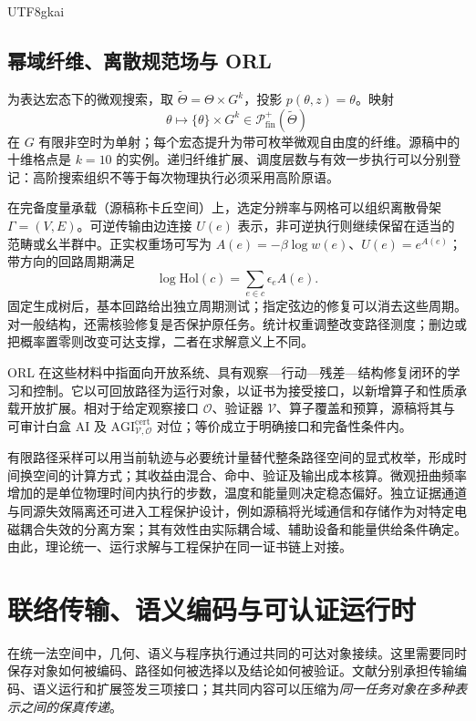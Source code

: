 \documentclass[11pt,a4paper]{article}
\theoremstyle{plain}
\theoremstyle{definition}
\theoremstyle{remark}
\begin{document}
\begin{CJK*}{UTF8}{gkai}
\subsection{幂域纤维、离散规范场与 ORL}

为表达宏态下的微观搜索，取 $\widetilde\Theta=\Theta\times G^k$，投影 $p(\theta,z)=\theta$。映射
\[
 \theta\longmapsto\{\theta\}\times G^k
 \in\mathcal P^+_{\mathrm{fin}}(\widetilde\Theta)
\]
在 $G$ 有限非空时为单射；每个宏态提升为带可枚举微观自由度的纤维。源稿中的十维格点是 $k=10$ 的实例。递归纤维扩展、调度层数与有效一步执行可以分别登记：高阶搜索组织不等于每次物理执行必须采用高阶原语。\cite{S16}

在完备度量承载（源稿称卡丘空间）上，选定分辨率与网格可以组织离散骨架 $\Gamma=(V,E)$。可逆传输由边连接 $U(e)$ 表示，非可逆执行则继续保留在适当的范畴或幺半群中。正实权重场可写为 $A(e)=-\beta\log w(e)$、$U(e)=e^{A(e)}$；带方向的回路周期满足
\[
 \log\mathrm{Hol}(c)=\sum_{e\in c}\epsilon_eA(e).
\]
固定生成树后，基本回路给出独立周期测试；指定弦边的修复可以消去这些周期。对一般结构，还需核验修复是否保护原任务。统计权重调整改变路径测度；删边或把概率置零则改变可达支撑，二者在求解意义上不同。

ORL 在这些材料中指面向开放系统、具有观察—行动—残差—结构修复闭环的学习和控制。它以可回放路径为运行对象，以证书为接受接口，以新增算子和性质承载开放扩展。相对于给定观察接口 $\mathcal O$、验证器 $\mathcal V$、算子覆盖和预算，源稿将其与可审计白盒 AI 及 $\mathrm{AGI}^{\mathrm{cert}}_{\mathcal V,\mathcal O}$ 对位；等价成立于明确接口和完备性条件内。

有限路径采样可以用当前轨迹与必要统计量替代整条路径空间的显式枚举，形成时间换空间的计算方式；其收益由混合、命中、验证及输出成本核算。微观扭曲频率增加的是单位物理时间内执行的步数，温度和能量则决定稳态偏好。独立证据通道与同源失效隔离还可进入工程保护设计，例如源稿将光域通信和存储作为对特定电磁耦合失效的分离方案；其有效性由实际耦合域、辅助设备和能量供给条件确定。由此，理论统一、运行求解与工程保护在同一证书链上对接。\cite{S16}


\section{联络传输、语义编码与可认证运行时}
\label{ss:semantic}

在统一法空间中，几何、语义与程序执行通过共同的可达对象接续。这里需要同时保存对象如何被编码、路径如何被选择以及结论如何被验证。文献\cite{S19,S20,S22}分别承担传输编码、语义运行和扩展签发三项接口；其共同内容可以压缩为\emph{同一任务对象在多种表示之间的保真传递}。


\end{CJK*}
\end{document}
